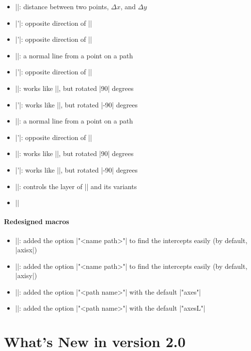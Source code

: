 \begin{itemize}
\item |\tzdistance|: distance between two points, $\Delta x$, and $\Delta y$
%
\listdivider
\item |\tzslopeat'|: opposite direction of |\tzslopeat|
\item |\tzslope'|: opposite direction of |\tzslope|
%
\listdivider
\item |\tznormalat|: a normal line from a point on a path
\item |\tznormalat'|: opposite direction of |\tznormalat|
\item |\tznormalat*|: works like |\tzslopeat|, but rotated |90| degrees
\item |\tznormalat*'|: works like |\tzslopeat|, but rotated |-90| degrees
\item |\tznormal|: a normal line from a point on a path
\item |\tznormal'|: opposite direction of |\tznormal|
\item |\tznormal*|: works like |\tzslope|, but rotated |90| degrees
\item |\tznormal*'|: works like |\tzslope|, but rotated |-90| degrees
\item |\settznormallayer|: controls the layer of |\tznormalat| and its variants
\item |\settznormalepsilon|
\end{itemize}

\paragraph{Redesigned macros}

\begin{itemize}
\item |\tzaxisx|: added the option |"<name path>"| to find the intercepts easily (by default, |axisx|)
\item |\tzaxisy|: added the option |"<name path>"| to find the intercepts easily (by default, |axisy|)
\item |\tzaxes|: added the option |"<path name>"| with the default |"axes"|
\item |\tzaxesL|: added the option |"<path name>"| with the default |"axesL"|
\end{itemize}

\section{What's New in version 2.0}

